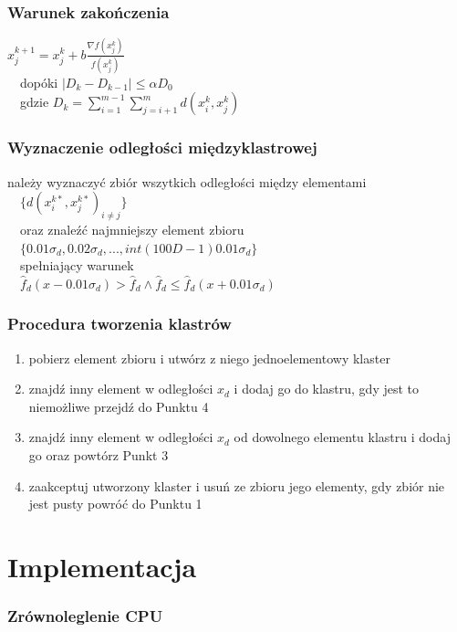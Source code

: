\documentclass{beamer}
\begin{document}
\begin{frame}\frametitle{Warunek zakończenia}
\begin{center}
$x_j^{k+1} = x_j^k + b\frac{\nabla f(x_j^k)}{f(x_j^k)}$ \\~\
dopóki $|D_k - D_{k-1}| \leq \alpha D_0$ \\~\
gdzie $D_k = \displaystyle\sum_{i=1}^{m-1} \displaystyle\sum_{j=i+1}^{m} d(x_i^k, x_j^k)$
\end{center}
\end{frame}

\begin{frame}\frametitle{Wyznaczenie odległości międzyklastrowej}
\begin{center}
należy wyznaczyć zbiór wszytkich odległości między elementami \\~\
$\{d(x^{k*}_i, x^{k*}_j)_{i \neq j}\}$ \\~\
oraz znaleźć najmniejszy element zbioru \\~\
$\{0.01 \sigma_d, 0.02 \sigma_d, ... , int(100D-1) 0.01 \sigma_d \}$ \\~\
spełniający warunek \\~\
$\hat{f}_d(x-0.01\sigma_d) > \hat{f}_d \wedge \hat{f}_d \leq \hat{f}_d(x+0.01\sigma_d)$
\end{center}
\end{frame}

\begin{frame}\frametitle{Procedura tworzenia klastrów}
\begin{enumerate}
\item pobierz element zbioru i utwórz z niego jednoelementowy klaster
\item znajdź inny element w odległości $x_d$ i dodaj go do klastru, gdy jest to niemożliwe przejdź do Punktu 4
\item znajdź inny element w odległości $x_d$ od dowolnego elementu klastru i dodaj go oraz powtórz Punkt 3
\item zaakceptuj utworzony klaster i usuń ze zbioru jego elementy, gdy zbiór nie jest pusty powróć do Punktu 1
\end{enumerate}
\end{frame}




\section{Implementacja}
\begin{frame}\frametitle{Zrównoleglenie CPU}

\end{frame}
\end{document}
